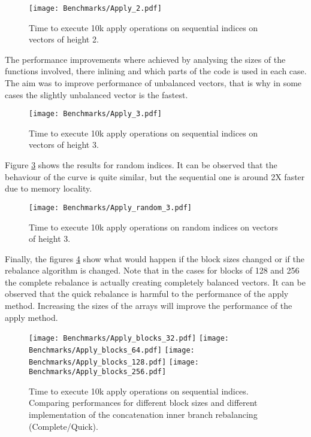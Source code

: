 \begin{figure}[h!]
  \centering
  \texttt{[image: Benchmarks/Apply\_2.pdf]}
  \caption{Time to execute 10k apply operations on sequential indices on vectors of height 2.}
   \label{ApplyBenchmarks2}
\end{figure}

The performance improvements where achieved by analysing the sizes of the functions involved, there inlining and which parts of the code is used in each case. The aim was to improve performance of unbalanced vectors, that is why in some cases the slightly unbalanced vector is the fastest. 

\begin{figure}[h!]
  \centering
  \texttt{[image: Benchmarks/Apply\_3.pdf]}
  \caption{Time to execute 10k apply operations on sequential indices on vectors of height 3.}
   \label{ApplyBenchmarks3}
\end{figure}

\FloatBarrier

Figure \ref{ApplyRandomBenchmarks} shows the results for random indices. It can be observed that the behaviour of the curve is quite similar, but the sequential one is around 2X faster due to memory locality.

\begin{figure}[h!]
  \centering
  \texttt{[image: Benchmarks/Apply\_random\_3.pdf]}
  \caption{Time to execute 10k apply operations on random indices on vectors of height 3.}
  \label{ApplyRandomBenchmarks}
\end{figure}

\FloatBarrier

Finally, the figures \ref{ApplyBlocksBenchmarks} show what would happen if the block sizes changed or if the rebalance algorithm is changed. Note that in the cases for blocks of 128 and 256 the complete rebalance is actually creating completely balanced vectors. It can be observed that the quick rebalance is harmful to the performance of the apply method. Increasing the sizes of the arrays will improve the performance of the apply method.

\begin{figure}[h!]
  \centering
  \texttt{[image: Benchmarks/Apply\_blocks\_32.pdf]}
  \texttt{[image: Benchmarks/Apply\_blocks\_64.pdf]}
  \texttt{[image: Benchmarks/Apply\_blocks\_128.pdf]}
  \texttt{[image: Benchmarks/Apply\_blocks\_256.pdf]}
   \caption{Time to execute 10k apply operations on sequential indices. Comparing performances for different block sizes and different implementation of the concatenation inner branch rebalancing (Complete/Quick).}
  \label{ApplyBlocksBenchmarks}
\end{figure}

